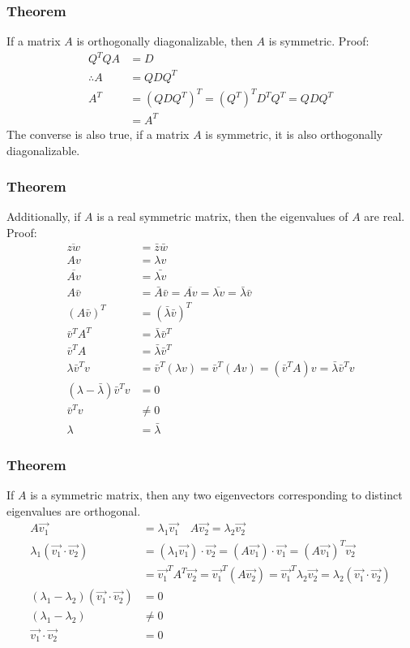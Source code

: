 \documentclass{math}
\begin{document}
\subsubsection*{Theorem}
If a matrix \( A \) is orthogonally diagonalizable, then \( A \) is symmetric.
Proof:
\begin{align*}
  Q^TQA &= D \\
  \therefore A &= QDQ^T \\
  A^T &= (QDQ^T)^T = (Q^T)^TD^TQ^T = QDQ^T \\
  &= A^T
\end{align*}
The converse is also true, if a matrix \( A \) is symmetric, it is also
orthogonally diagonalizable.

\subsubsection*{Theorem}
Additionally, if \( A \) is a real symmetric matrix, then the eigenvalues of
\( A \) are real. Proof:
\begin{align*}
  \overline{zw} &= \bar{z}\bar{w} \\
  Av &= \lambda v \\
  \overline{Av} &= \bar{\lambda v} \\
  A\bar{v} &= \bar{A}\bar{v} = \overline{Av} = \overline{\lambda v} =
    \bar{\lambda}\bar{v} \\
  (A\bar{v})^T &= (\bar{\lambda}\bar{v})^T \\
  \bar{v}^TA^T &= \bar{\lambda}\bar{v}^T \\
  \bar{v}^TA &= \bar{\lambda}\bar{v}^T \\
  \lambda\bar{v}^Tv &= \bar{v}^T(\lambda v) = \bar{v}^T(Av) = (\bar{v}^TA)v =
    \bar{\lambda}\bar{v}^Tv \\
  (\lambda-\bar{\lambda})\bar{v}^Tv &= 0 \\
  \bar{v}^Tv &\ne 0 \\
  \lambda &= \bar{\lambda}
\end{align*}

\subsubsection*{Theorem}
If \( A \) is a symmetric matrix, then any two eigenvectors corresponding to
distinct eigenvalues are orthogonal.
\begin{align*}
  A\vec{v_1} &= \lambda_1\vec{v_1} \quad A\vec{v_2} = \lambda_2\vec{v_2} \\
  \lambda_1(\vec{v_1}\cdot\vec{v_2}) &= (\lambda_1\vec{v_1})\cdot\vec{v_2} =
    (A\vec{v_1})\cdot\vec{v_1} = (A\vec{v_1})^T\vec{v_2} \\
  &= \vec{v_1}^TA^T\vec{v_2} = \vec{v_1}^T(A\vec{v_2}) =
    \vec{v_1}^T\lambda_2\vec{v_2} = \lambda_2(\vec{v_1}\cdot\vec{v_2}) \\
  (\lambda_1-\lambda_2)(\vec{v_1}\cdot\vec{v_2}) &= 0 \\
  (\lambda_1-\lambda_2) &\ne 0 \\
  \vec{v_1}\cdot\vec{v_2} &= 0
\end{align*}
\end{document}
